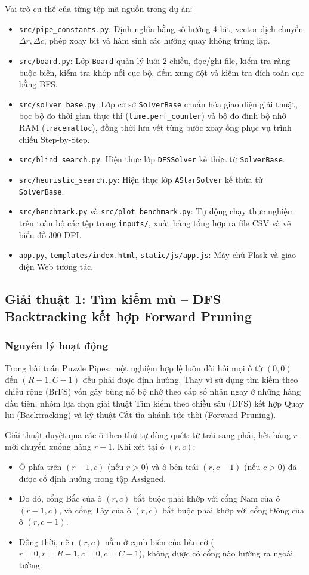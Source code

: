 \documentclass[a4paper]{article}
\begin{document}
Vai trò cụ thể của từng tệp mã nguồn trong dự án:
\begin{itemize}
    \item \texttt{src/pipe\_constants.py}: Định nghĩa hằng số hướng 4-bit, vector dịch chuyển $\Delta r, \Delta c$, phép xoay bit và hàm sinh các hướng quay không trùng lặp.
    \item \texttt{src/board.py}: Lớp \texttt{Board} quản lý lưới 2 chiều, đọc/ghi file, kiểm tra ràng buộc biên, kiểm tra khớp nối cục bộ, đếm xung đột và kiểm tra đích toàn cục bằng BFS.
    \item \texttt{src/solver\_base.py}: Lớp cơ sở \texttt{SolverBase} chuẩn hóa giao diện giải thuật, bọc bộ đo thời gian thực thi (\texttt{time.perf\_counter}) và bộ đo đỉnh bộ nhớ RAM (\texttt{tracemalloc}), đồng thời lưu vết từng bước xoay ống phục vụ trình chiếu Step-by-Step.
    \item \texttt{src/blind\_search.py}: Hiện thực lớp \texttt{DFSSolver} kế thừa từ \texttt{SolverBase}.
    \item \texttt{src/heuristic\_search.py}: Hiện thực lớp \texttt{AStarSolver} kế thừa từ \texttt{SolverBase}.
    \item \texttt{src/benchmark.py} và \texttt{src/plot\_benchmark.py}: Tự động chạy thực nghiệm trên toàn bộ các tệp trong \texttt{inputs/}, xuất bảng tổng hợp ra file CSV và vẽ biểu đồ 300 DPI.
    \item \texttt{app.py}, \texttt{templates/index.html}, \texttt{static/js/app.js}: Máy chủ Flask và giao diện Web tương tác.
\end{itemize}

\subsection{Giải thuật 1: Tìm kiếm mù -- DFS Backtracking kết hợp Forward Pruning}
\subsubsection{Nguyên lý hoạt động}
Trong bài toán Puzzle Pipes, một nghiệm hợp lệ luôn đòi hỏi mọi ô từ $(0, 0)$ đến $(R-1, C-1)$ đều phải được định hướng. Thay vì sử dụng tìm kiếm theo chiều rộng (BrFS) vốn gây bùng nổ bộ nhớ theo cấp số nhân ngay ở những hàng đầu tiên, nhóm lựa chọn giải thuật Tìm kiếm theo chiều sâu (DFS) kết hợp Quay lui (Backtracking) và kỹ thuật Cắt tỉa nhánh tức thời (Forward Pruning).

Giải thuật duyệt qua các ô theo thứ tự dòng quét: từ trái sang phải, hết hàng $r$ mới chuyển xuống hàng $r+1$. Khi xét tại ô $(r, c)$:
\begin{itemize}
    \item Ô phía trên $(r-1, c)$ (nếu $r > 0$) và ô bên trái $(r, c-1)$ (nếu $c > 0$) đã được cố định hướng trong tập $\text{Assigned}$.
    \item Do đó, cổng Bắc của ô $(r, c)$ bắt buộc phải khớp với cổng Nam của ô $(r-1, c)$, và cổng Tây của ô $(r, c)$ bắt buộc phải khớp với cổng Đông của ô $(r, c-1)$.
    \item Đồng thời, nếu $(r, c)$ nằm ở cạnh biên của bàn cờ ($r=0, r=R-1, c=0, c=C-1$), không được có cổng nào hướng ra ngoài tường.
\end{itemize}
\end{document}
